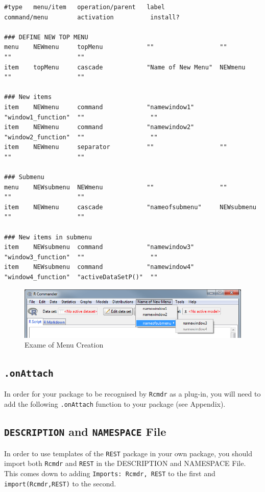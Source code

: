\documentclass[a4paper]{article}\usepackage[]{graphicx}\usepackage[]{color}
\begin{document}
\footnotesize
\begin{verbatim}
#type   menu/item   operation/parent   label               command/menu        activation          install?

### DEFINE NEW TOP MENU	
menu    NEWmenu     topMenu            ""                  ""                  ""                  ""
item    topMenu     cascade            "Name of New Menu"  NEWmenu             ""                  ""

### New items
item    NEWmenu     command            "namewindow1"       "window1_function"  ""                  ""
item    NEWmenu     command            "namewindow2"       "window2_function"  ""                  ""
item    NEWmenu     separator          ""                  ""                  ""                  ""

### Submenu
menu    NEWsubmenu  NEWmenu            ""                  ""                  ""                  ""
item    NEWmenu     cascade            "nameofsubmenu"     NEWsubmenu          ""                  ""

### New items in submenu
item    NEWsubmenu  command            "namewindow3"       "window3_function"  ""                  ""
item    NEWsubmenu  command            "namewindow4"       "window4_function"  "activeDataSetP()"  ""
\end{verbatim}
\normalsize
\begin{figure}[H]
\centering
\includegraphics[width=12cm]{figures/examplemenus.png}
\caption{Exame of Menu Creation \label{examplemenus}}
\end{figure}


\subsection{\texttt{.onAttach}}
\noindent In order for your package to be recognised by \texttt{Rcmdr} as a
plug-in, you will need to add the following \texttt{.onAttach} function to your
package (see Appendix).

\subsection{\texttt{DESCRIPTION} and \texttt{NAMESPACE} File}
In order to use templates of the \verb|REST| package in your own package, you
should import both \verb|Rcmdr| and \verb|REST| in the DESCRIPTION and
NAMESPACE File.\\
This comes down to adding \verb|Imports: Rcmdr, REST| to the first and
\verb|import(Rcmdr,REST)| to the second.
\end{document}
